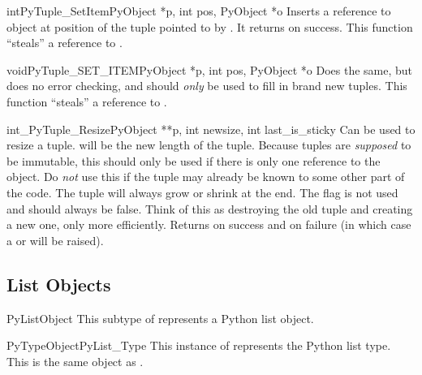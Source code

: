 \documentclass{manual}
\begin{document}
\begin{cfuncdesc}{int}{PyTuple_SetItem}{PyObject *p,
                                        int pos, PyObject *o}
Inserts a reference to object  at position  of
the tuple pointed to by . It returns  on success.
  This function ``steals'' a reference to .
\end{cfuncdesc}

\begin{cfuncdesc}{void}{PyTuple_SET_ITEM}{PyObject *p,
                                          int pos, PyObject *o}
Does the same, but does no error checking, and
should \emph{only} be used to fill in brand new tuples.
  This function ``steals'' a reference to .
\end{cfuncdesc}

\begin{cfuncdesc}{int}{_PyTuple_Resize}{PyObject **p,
                                        int newsize, int last_is_sticky}
Can be used to resize a tuple.   will be the new length
of the tuple.  Because tuples are \emph{supposed} to be immutable,
this should only be used if there is only one reference to the object.
Do \emph{not} use this if the tuple may already be known to some other
part of the code.  The tuple will always grow or shrink at the end.  The
 flag is not used and should always be false.  Think
of this as destroying the old tuple and creating a new one, only more
efficiently.  Returns  on success and  on failure (in
which case a  or  will be
raised).
\end{cfuncdesc}


\subsection{List Objects \label{listObjects}}

\begin{ctypedesc}{PyListObject}
This subtype of  represents a Python list object.
\end{ctypedesc}

\begin{cvardesc}{PyTypeObject}{PyList_Type}
This instance of  represents the Python list
type.  This is the same object as .
\end{cvardesc}
\end{document}
